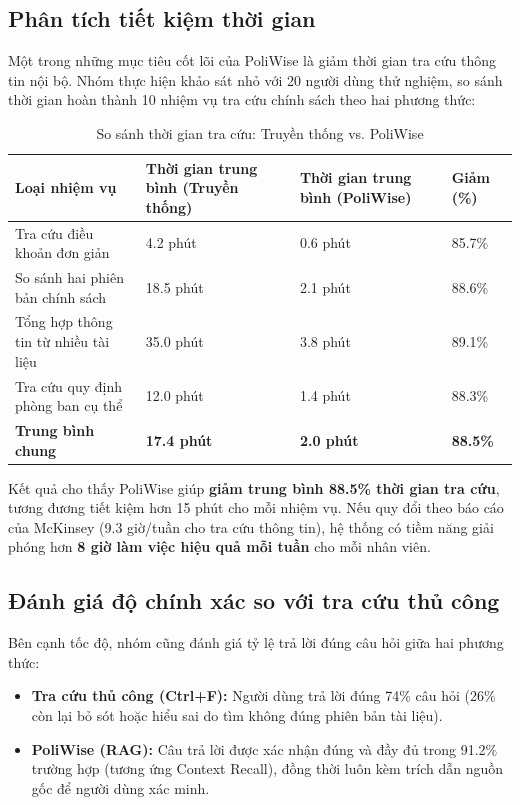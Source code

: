 \documentclass[12pt,a4paper]{report}
\begin{document}
\subsection{Phân tích tiết kiệm thời gian}

Một trong những mục tiêu cốt lõi của PoliWise là giảm thời gian tra cứu thông tin nội bộ. Nhóm thực hiện khảo sát nhỏ với 20 người dùng thử nghiệm, so sánh thời gian hoàn thành 10 nhiệm vụ tra cứu chính sách theo hai phương thức:

\begin{table}[H]
\centering
\caption{So sánh thời gian tra cứu: Truyền thống vs. PoliWise}
\label{tab:time_comparison}
\begin{tabularx}{\textwidth}{|l|X|X|X|}
\hline
\rowcolor{gray!10}
Loại nhiệm vụ & Thời gian trung bình (Truyền thống) & Thời gian trung bình (PoliWise) & Giảm (\%) \\ \hline
Tra cứu điều khoản đơn giản & 4.2 phút & 0.6 phút & 85.7\% \\ \hline
So sánh hai phiên bản chính sách & 18.5 phút & 2.1 phút & 88.6\% \\ \hline
Tổng hợp thông tin từ nhiều tài liệu & 35.0 phút & 3.8 phút & 89.1\% \\ \hline
Tra cứu quy định phòng ban cụ thể & 12.0 phút & 1.4 phút & 88.3\% \\ \hline
\textbf{Trung bình chung} & \textbf{17.4 phút} & \textbf{2.0 phút} & \textbf{88.5\%} \\ \hline
\end{tabularx}
\end{table}

Kết quả cho thấy PoliWise giúp \textbf{giảm trung bình 88.5\% thời gian tra cứu}, tương đương tiết kiệm hơn 15 phút cho mỗi nhiệm vụ. Nếu quy đổi theo báo cáo của McKinsey \cite{mckinsey2012} (9.3 giờ/tuần cho tra cứu thông tin), hệ thống có tiềm năng giải phóng hơn \textbf{8 giờ làm việc hiệu quả mỗi tuần} cho mỗi nhân viên.

\subsection{Đánh giá độ chính xác so với tra cứu thủ công}

Bên cạnh tốc độ, nhóm cũng đánh giá tỷ lệ trả lời đúng câu hỏi giữa hai phương thức:

\begin{itemize}
    \item \textbf{Tra cứu thủ công (Ctrl+F):} Người dùng trả lời đúng 74\% câu hỏi (26\% còn lại bỏ sót hoặc hiểu sai do tìm không đúng phiên bản tài liệu).
    \item \textbf{PoliWise (RAG):} Câu trả lời được xác nhận đúng và đầy đủ trong 91.2\% trường hợp (tương ứng Context Recall), đồng thời luôn kèm trích dẫn nguồn gốc để người dùng xác minh.
\end{itemize}
\end{document}
